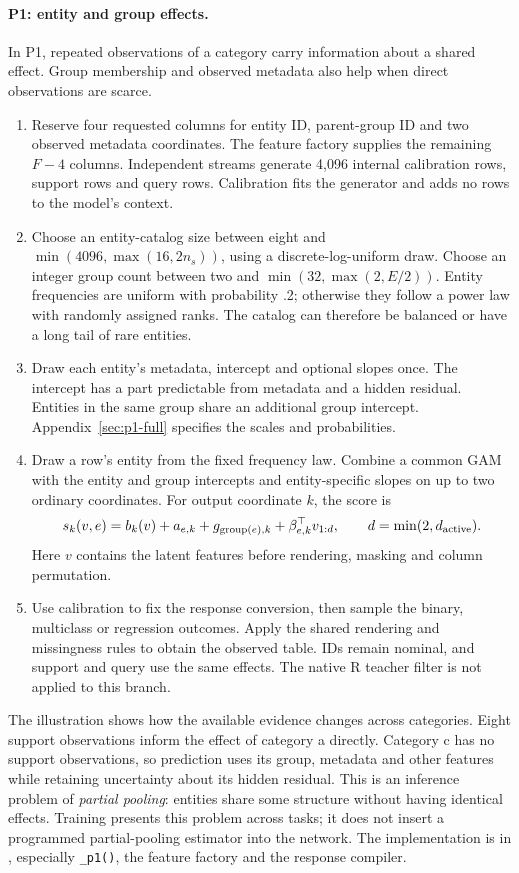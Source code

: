 \documentclass[11pt]{article}
\begin{document}
\paragraph{P1: entity and group effects.}
In P1, repeated observations of a category carry information about a shared effect. Group membership and observed metadata also help when direct observations are scarce.
\begin{enumerate}
\item Reserve four requested columns for entity ID, parent-group ID and two observed metadata coordinates. The feature factory supplies the remaining $F-4$ columns. Independent streams generate 4,096 internal calibration rows, support rows and query rows. Calibration fits the generator and adds no rows to the model's context.
\item Choose an entity-catalog size between eight and $\min(4096,\max(16,2n_s))$, using a discrete-log-uniform draw. Choose an integer group count between two and $\min(32,\max(2,E/2))$. Entity frequencies are uniform with probability .2; otherwise they follow a power law with randomly assigned ranks. The catalog can therefore be balanced or have a long tail of rare entities.
\item Draw each entity's metadata, intercept and optional slopes once. The intercept has a part predictable from metadata and a hidden residual. Entities in the same group share an additional group intercept. Appendix~\ref{sec:p1-full} specifies the scales and probabilities.
\item Draw a row's entity from the fixed frequency law. Combine a common GAM with the entity and group intercepts and entity-specific slopes on up to two ordinary coordinates. For output coordinate $k$, the score is
\[
 s_k(v,e)=b_k(v)+a_{e,k}+g_{\operatorname{group}(e),k}
                    +\beta_{e,k}^{\top}v_{1:d},\qquad d=\min(2,d_{\rm active}).
\]
Here $v$ contains the latent features before rendering, masking and column permutation.
\item Use calibration to fix the response conversion, then sample the binary, multiclass or regression outcomes. Apply the shared rendering and missingness rules to obtain the observed table. IDs remain nominal, and support and query use the same effects. The native R teacher filter is not applied to this branch.
\end{enumerate}

The illustration shows how the available evidence changes across categories. Eight support observations inform the effect of category a directly. Category c has no support observations, so prediction uses its group, metadata and other features while retaining uncertainty about its hidden residual. This is an inference problem of \emph{partial pooling}: entities share some structure without having identical effects. Training presents this problem across tasks; it does not insert a programmed partial-pooling estimator into the network. The implementation is in , especially \texttt{\_p1()}, the feature factory and the response compiler.
\end{document}
